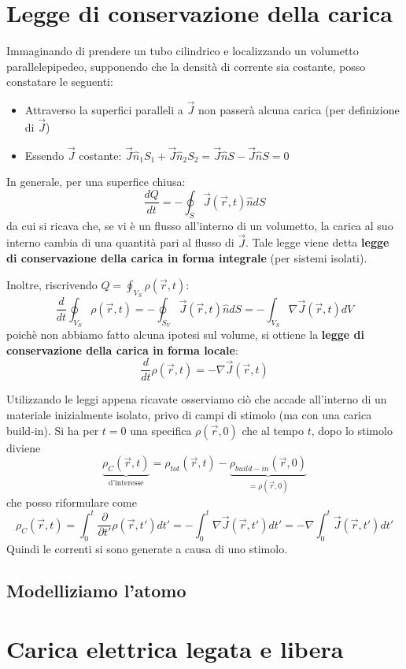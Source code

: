 \documentclass{book}
\begin{document}
\section{Legge di conservazione della carica}
Immaginando di prendere un tubo cilindrico e localizzando un volumetto parallelepipedeo, supponendo che la densità di corrente sia costante,
posso constatare le seguenti:
\begin{itemize}
  \item Attraverso la superfici paralleli a $\vec{J}$ non passerà alcuna carica (per definizione di $\vec{J}$)
  \item Essendo $\vec{J}$ costante: $\vec{J} \hat{n}_1 S_1 + \vec{J} \hat{n}_2 S_2 = \vec{J} \hat{n} S - \vec{J} \hat{n} S = 0 $
\end{itemize}
In generale, per una superfice chiusa:
\[
\frac{dQ}{dt}=-\oint_S \vec{J}(\vec{r}, t)\hat{n}dS
\]
da cui si ricava che, se vi è un flusso all'interno di un volumetto, la carica al suo interno cambia di una quantità pari al flusso di $\vec{J}$.
Tale legge viene detta \textbf{legge di conservazione della carica in forma integrale} (per sistemi isolati).

Inoltre, riscrivendo $Q=\oint_{V_S}\rho(\vec{r},t)$:
\[
\displaystyle \frac{d}{dt}\oint_{V_S}\rho(\vec{r},t)=-\oint_{S_V}\vec{J}(\vec{r},t)\hat{n}dS=-\int_{V_{S}} \nabla \vec{J}(\vec{r},t) dV
\]
poichè non abbiamo fatto alcuna ipotesi sul volume, si ottiene la \textbf{legge di conservazione della carica in forma locale}:
\[
\frac{d}{dt}\rho(\vec{r},t)=-\nabla\vec{J}(\vec{r},t)
\]

Utilizzando le leggi appena ricavate osserviamo ciò che accade all'interno di un materiale inizialmente isolato, privo di campi di stimolo
(ma con una carica build-in). Si ha per $t=0$ una specifica $\rho(\vec{r},0)$ che al tempo $t$, dopo lo stimolo diviene
\[
 \underbrace{\rho_{C}(\vec{r},t)}_{\text{d'interesse}}= \rho_{tot}(\vec{r},t)- \underbrace{\rho_{build-in}(\vec{r},0)}_{=\rho(\vec{r},0)}
\]
che posso riformulare come 
\[
\rho_{C}(\vec{r},t)=\int_{0}^{t}\frac{\partial}{\partial{t'}}\rho(\vec{r},t')dt'=-\int_{0}^{t}\nabla\vec{J}(\vec{r},t')dt'=-\nabla\int_{0}^{t}\vec{J}(\vec{r},t')dt'
\]
Quindi le correnti si sono generate a causa di uno stimolo.
\subsection{Modelliziamo l'atomo}
\section{Carica elettrica legata e libera}
\end{document}
